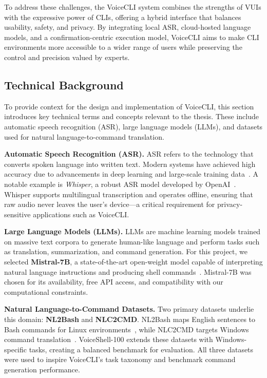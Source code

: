 \documentclass[a4paper,12pt]{article}
\begin{document}
To address these challenges, the VoiceCLI system combines the strengths of VUIs with the expressive power of CLIs, offering a hybrid interface that balances usability, safety, and privacy. By integrating local ASR, cloud-hosted language models, and a confirmation-centric execution model, VoiceCLI aims to make CLI environments more accessible to a wider range of users while preserving the control and precision valued by experts.

\subsection{Technical Background}
To provide context for the design and implementation of VoiceCLI, this section introduces key technical terms and concepts relevant to the thesis. These include automatic speech recognition (ASR), large language models (LLMs), and datasets used for natural language-to-command translation.

\textbf{Automatic Speech Recognition (ASR).} ASR refers to the technology that converts spoken language into written text. Modern systems have achieved high accuracy due to advancements in deep learning and large-scale training data~\cite{ref5}. A notable example is \textit{Whisper}, a robust ASR model developed by OpenAI~\cite{ref10}. Whisper supports multilingual transcription and operates offline, ensuring that raw audio never leaves the user's device—a critical requirement for privacy-sensitive applications such as VoiceCLI.

\textbf{Large Language Models (LLMs).} LLMs are machine learning models trained on massive text corpora to generate human-like language and perform tasks such as translation, summarization, and command generation. For this project, we selected \textbf{Mistral-7B}, a state-of-the-art open-weight model capable of interpreting natural language instructions and producing shell commands~\cite{ref11}. Mistral-7B was chosen for its availability, free API access, and compatibility with our computational constraints.



\textbf{Natural Language-to-Command Datasets.} Two primary datasets underlie this domain: \textbf{NL2Bash} and \textbf{NLC2CMD}. NL2Bash maps English sentences to Bash commands for Linux environments~\cite{ref26}, while NLC2CMD targets Windows command translation~\cite{ref27}. VoiceShell-100 extends these datasets with Windows-specific tasks, creating a balanced benchmark for evaluation. All three datasets were used to inspire VoiceCLI's task taxonomy and benchmark command generation performance.
\end{document}
